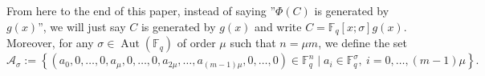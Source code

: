\documentclass[12pt,paper]{article}
\newcommand{\hlc}[2][yellow]{ {\sethlcolor{#1} \hl{#2}} }
\theoremstyle{plain}
\newcommand{\Fq}{\mathbb{F}_{q}}
\DeclareMathOperator{\aut}{Aut}
\DeclareMathOperator{\gcrd}{gcrd}
\begin{document}
From here to the end of this paper, instead of saying ''$\Phi(C)$ is generated by $g(x)$'', we will just say $C$ is generated by $g(x)$ and write $ C= \Fq[x;\sigma] g(x).$ 
     Moreover, for any  $ \sigma \in \aut(\Fq)$ of order $ \mu $ such that $ n = \mu m$, we define the  set
$$
\mathcal{A}_{\sigma} := \left\{ (a_0, 0, \ldots, 0, a_{\mu}, 0, \ldots, 0, a_{2\mu}, \ldots, a_{(m-1)\mu}, 0, \ldots, 0) \in \mathbb{F}_q^n \mid a_i \in \mathbb{F}_{q}^{\sigma}, \ i = 0,  \ldots, (m-1)\mu \right\}.
$$
\end{document}
